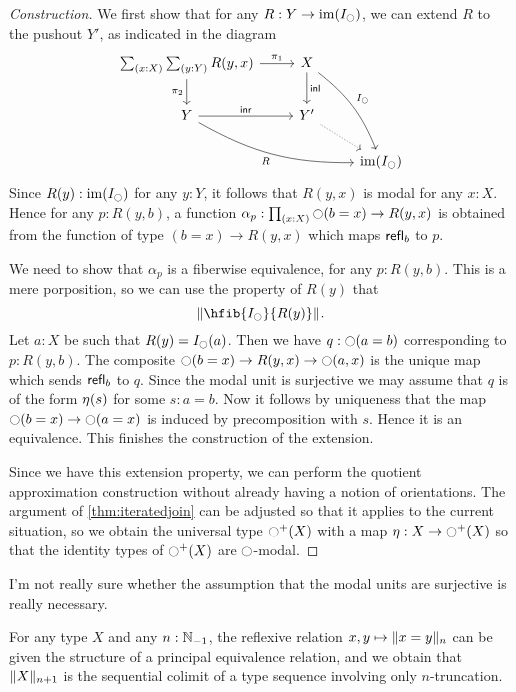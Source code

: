 \begin{proof}[Construction]
We first show that for any $R:Y\to\im(I_\modal)$, we can extend $R$ to the pushout $Y'$, as indicated in the diagram
\begin{equation*}
\begin{tikzcd}
\sm{x:X}{y:Y}R(y,x) \arrow[r,"\pi_1"] \arrow[d,swap,"\pi_2"] & X \arrow[d,"\inl"] \arrow[ddr,bend left=15,"I_\modal"] \\
Y \arrow[drr,swap,bend right=15,"R"] \arrow[r,"\inr"] & Y' \arrow[dr,densely dotted] \\
& & \im(I_\modal)
\end{tikzcd}
\end{equation*}
Since $R(y):\im(I_\modal)$ for any $y:Y$, it follows that $R(y,x)$ is modal for any $x:X$. Hence for any $p:R(y,b)$, a function $\alpha_p:\prd{x:X}\modal(b=x)\to R(y,x)$ is obtained from the function of type $(b=x)\to R(y,x)$ which maps $\refl{b}$ to $p$.

We need to show that $\alpha_p$ is a fiberwise equivalence, for any $p:R(y,b)$. This is a mere porposition, so we can use the property of $R(y)$ that 
\begin{equation*}
\brck{\hfib{I_\modal}{R(y)}}.
\end{equation*}
Let $a:X$ be such that $R(y)=I_\modal(a)$. Then we have $q:\modal(a=b)$ corresponding to $p:R(y,b)$. The composite $\modal(b=x)\to R(y,x)\to \modal(a,x)$ is the unique map which sends $\refl{b}$ to $q$. Since the modal unit is surjective we may assume that $q$ is of the form $\modalunit(s)$ for some $s:a=b$. Now it follows by uniqueness that the map $\modal(b=x)\to\modal(a=x)$ is induced by precomposition with $s$. Hence it is an equivalence. This finishes the construction of the extension.

Since we have this extension property, we can perform the quotient approximation construction without already having a notion of orientations. The argument of \autoref{thm:iteratedjoin} can be adjusted so that it applies to the current situation, so we obtain the universal type $\modal^+(X)$ with a map $\eta:X\to \modal^+(X)$ so that the identity types of $\modal^+(X)$ are $\modal$-modal.
\end{proof}

\begin{rmk}
I'm not really sure whether the assumption that the modal units are surjective is really necessary.
\end{rmk}

\begin{eg}
For any type $X$ and any $n:\N_{-1}$, the reflexive relation $x,y\mapsto\trunc{n}{x=y}$ can be given the structure of a principal equivalence relation, and we obtain that $\trunc{n+1}{X}$ is the sequential colimit of a type sequence involving only $n$-truncation.
\end{eg}

